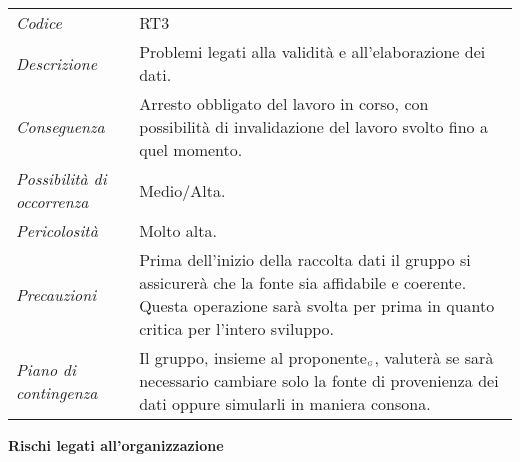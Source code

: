 {{{	\begin{center}
		\renewcommand{\arraystretch}{1.4}
		\begin{longtable}{|p{5cm}|p{12cm}|}
			\hline
			\rowcolor{airforceblue}
			\multicolumn{2}{|c|}{\textit{Validità dei dati}}\\
			\hline
			\textit{Codice} & RT3 \\
			\hline
			\textit{Descrizione} & Problemi legati alla validità e all'elaborazione dei dati. \\
			\hline
			\textit{Conseguenza} & Arresto obbligato del lavoro in corso, con possibilità di invalidazione del lavoro svolto fino a quel momento. \\
			\hline
			\textit{Possibilità di occorrenza} & Medio/Alta. \\
			\hline
			\textit{Pericolosità} & Molto alta. \\
			\hline
			\textit{Precauzioni} & Prima dell'inizio della raccolta dati il gruppo si assicurerà che la fonte sia affidabile e coerente.
			Questa operazione sarà svolta per prima in quanto critica per l'intero sviluppo.  \\
			\hline
			\textit{Piano di contingenza} & Il gruppo, insieme al proponente$_{\scaleto{G}{3pt}}$, valuterà se sarà necessario cambiare solo la fonte di provenienza dei dati oppure simularli in maniera consona. \\
			\hline
		\end{longtable}
	\end{center}
\clearpage
\quad
\begin{center}
	\LARGE\textbf{Rischi legati all'organizzazione}
\end{center}

\def\tabularxcolumn#1{m{#1}}
{

}}}}
